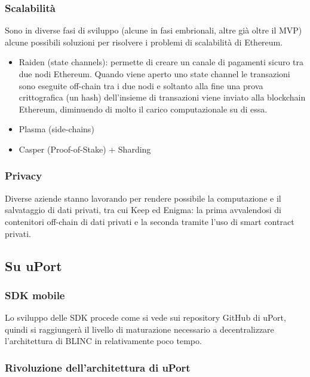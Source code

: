 \subsubsection{Scalabilità}

Sono in diverse fasi di sviluppo (alcune in fasi embrionali, altre già oltre il MVP)
alcune possibili soluzioni per risolvere i problemi di scalabilità di Ethereum.

\begin{itemize}
  \item Raiden (state channels): permette di creare un canale di pagamenti sicuro tra due nodi Ethereum.
  Quando viene aperto uno state channel le transazioni sono eseguite off-chain tra i due nodi e soltanto alla fine una prova 
  crittografica (un hash) dell'insieme di transazioni viene inviato alla blockchain Ethereum, diminuendo di molto il carico
  computazionale su di essa.
  \item Plasma (side-chains)
  \item Casper (Proof-of-Stake) + Sharding
\end{itemize}

\subsubsection{Privacy}

Diverse aziende stanno lavorando per rendere possibile la computazione
e il salvataggio di dati privati, tra cui Keep ed Enigma: la prima avvalendosi di contenitori
off-chain di dati privati e la seconda tramite l’uso di smart contract privati.

\subsection{Su uPort}

\subsubsection{SDK mobile}

Lo sviluppo delle SDK procede come si vede sui repository GitHub di uPort,
quindi si raggiungerà il livello di maturazione necessario a decentralizzare
l’architettura di BLINC in relativamente poco tempo.

\subsubsection{Rivoluzione dell'architettura di uPort}

